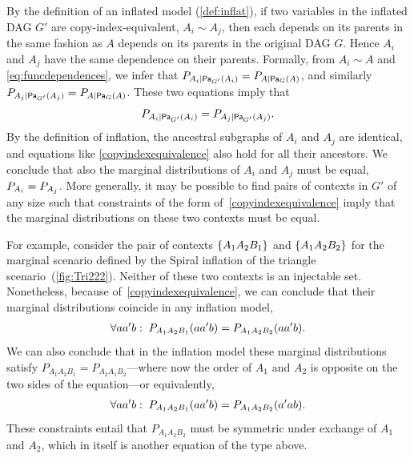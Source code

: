 {By the definition of an inflated model (\cref{def:inflat}), if two variables in the inflated DAG $G'$ are copy-index-equivalent, $A_i \sim A_j$, then each depends on its parents in the same fashion as $A$ depends on its parents in the original DAG $G$. Hence $A_i$ and $A_j$ have the same dependence on their parents.  Formally, from $A_i \sim A$ and \cref{eq:funcdependences}, we infer that $\pfunc{A_i| \Pa[G']{A_i}}=\pfunc{A|\Pa[G]{A}}$, and similarly $\pfunc{A_j| \Pa[G']{A_j}}=\pfunc{A|\Pa[G]{A}}$.  These two equations imply that 
\begin{align}\label{copyindexequivalence}
\pfunc{A_i| \Pa[G']{A_i}}=\pfunc{A_j|\Pa[G']{A_j}}.
 \end{align}
By the definition of inflation, the ancestral subgraphs of $A_i$ and $A_j$ are identical, and equations like \cref{copyindexequivalence} also hold for all their ancestors. We conclude that also the marginal distributions of $A_i$ and $A_j$ must be equal, $\pfunc{A_i}=\pfunc{A_j}$.
More generally, it may be possible to find pairs of contexts in $G'$ of any size such that constraints of the form of~\cref{copyindexequivalence} imply that the marginal distributions on these two contexts must be equal. 

For example, consider the pair of contexts $\brackets{A_1 A_2 B_1}$ and $\brackets{A_1 A_2 B_2}$ for the marginal scenario defined by the Spiral inflation of the triangle scenario~(\cref{fig:Tri222}). Neither of these two contexts is an injectable set.  Nonetheless, because of~\cref{copyindexequivalence}, we can conclude that their marginal distributions coincide in any inflation model,
\begin{align}\label{CIEconsequence}
\forall{a a' b}:\;\p[A_1 A_2 B_1]{a a' b} = \p[A_1 A_2 B_2]{a a' b}.
\end{align}
We can also conclude that in the inflation model these marginal distributions satisfy  $P_{A_1 A_2 B_1}=P_{A_2 A_1 B_2}$---where now the order of $A_1$ and $A_2$ is opposite on the two sides of the equation---or equivalently, 
\begin{align}\label{CIEconsequence2}
\forall{a a' b}:\;\p[A_1 A_2 B_1]{a a' b} = \p[A_1 A_2 B_2]{a' a b}.
\end{align}
These constraints entail that $P_{A_1 A_2 B_2}$ must be symmetric under exchange of $A_1$ and $A_2$, which in itself is another equation of the type above.

}
